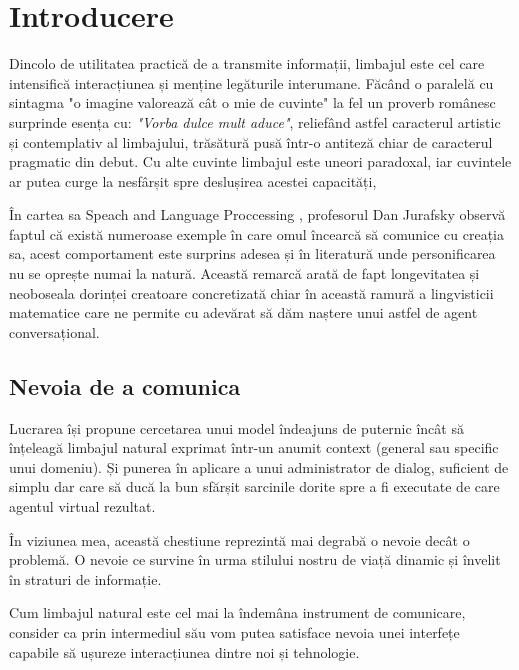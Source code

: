 \chapter{Introducere}


Dincolo de utilitatea practică de a transmite informații, limbajul este cel care intensifică interacțiunea și menține legăturile interumane. Făcând o paralelă cu sintagma "o imagine valorează cât o mie de cuvinte" la fel un proverb românesc surprinde esența cu: \textit{"Vorba dulce mult aduce"}, reliefând astfel caracterul artistic și contemplativ al limbajului, trăsătură pusă într-o antiteză chiar de caracterul pragmatic din debut. Cu alte cuvinte limbajul este uneori paradoxal, iar cuvintele ar putea curge la nesfârșit spre deslușirea acestei capacități,

În cartea sa Speach and Language Proccessing \cite{speach__lang_processing}, profesorul Dan Jurafsky observă faptul că există numeroase exemple în care omul încearcă să comunice cu creația sa, acest comportament este surprins adesea și în literatură unde personificarea nu se oprește numai la natură. Această remarcă arată de fapt longevitatea și neoboseala dorinței creatoare concretizată chiar în această ramură a lingvisticii matematice care ne permite cu adevărat să dăm naștere unui astfel de agent conversațional.


\section{Nevoia de a comunica}
Lucrarea își propune cercetarea unui model îndeajuns de puternic încât să înțeleagă limbajul natural exprimat într-un anumit context (general sau specific unui domeniu). Și punerea în aplicare a unui administrator de dialog, suficient de simplu dar care să ducă la bun sfărșit sarcinile dorite spre a fi executate de care agentul virtual rezultat.

În viziunea mea, această chestiune reprezintă mai degrabă o nevoie decât o problemă. O nevoie ce survine în urma stilului nostru de viață dinamic și învelit în straturi de informație.

Cum limbajul natural este cel mai la îndemâna instrument de comunicare, consider ca prin intermediul său vom putea satisface nevoia unei interfețe capabile să ușureze interacțiunea dintre noi și tehnologie.


